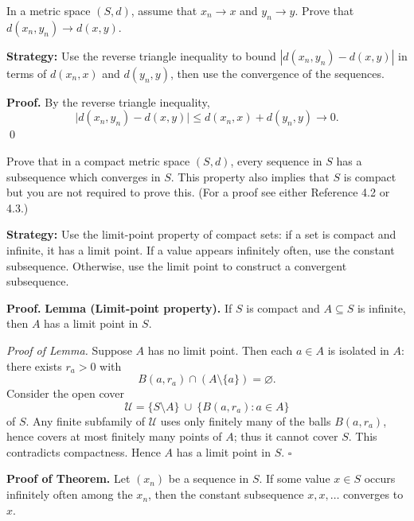 \begin{problembox}
\begin{problemstatement}
In a metric space $(S, d)$, assume that $x_n \to x$ and $y_n \to y$. Prove that $d(x_n, y_n) \to d(x, y)$.
\end{problemstatement}
\end{problembox}

\noindent\textbf{Strategy:} Use the reverse triangle inequality to bound $|d(x_n, y_n) - d(x, y)|$ in terms of $d(x_n, x)$ and $d(y_n, y)$, then use the convergence of the sequences.

\noindent\textbf{Proof.}
By the reverse triangle inequality,
\[
\big|d(x_n,y_n)-d(x,y)\big|\le d(x_n,x)+d(y_n,y)\to 0.
\]\qed
\medskip



\begin{problembox}
\begin{problemstatement}
Prove that in a compact metric space $(S, d)$, every sequence in $S$ has a subsequence which converges in $S$. This property also implies that $S$ is compact but you are not required to prove this. (For a proof see either Reference 4.2 or 4.3.)
\end{problemstatement}
\end{problembox}

\noindent\textbf{Strategy:} Use the limit-point property of compact sets: if a set is compact and infinite, it has a limit point. If a value appears infinitely often, use the constant subsequence. Otherwise, use the limit point to construct a convergent subsequence.

\noindent\textbf{Proof.}
\textbf{Lemma (Limit-point property).}
If \(S\) is compact and \(A\subseteq S\) is infinite, then \(A\) has a limit point in \(S\).

\emph{Proof of Lemma.}
Suppose \(A\) has no limit point. Then each \(a\in A\) is isolated in \(A\): there exists \(r_a>0\) with
\[
B(a,r_a)\cap (A\setminus\{a\})=\varnothing.
\]
Consider the open cover
\[
\mathcal{U}=\{S\setminus A\}\ \cup\ \{B(a,r_a):a\in A\}
\]
of \(S\). Any finite subfamily of \(\mathcal{U}\) uses only finitely many of the balls \(B(a,r_a)\), hence covers at most finitely many points of \(A\); thus it cannot cover \(S\). This contradicts compactness. Hence \(A\) has a limit point in \(S\). \(\square\)

\textbf{Proof of Theorem.}
Let \((x_n)\) be a sequence in \(S\).
If some value \(x\in S\) occurs infinitely often among the \(x_n\), then the constant subsequence \(x,x,\dots\) converges to \(x\).

